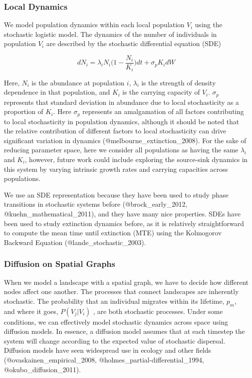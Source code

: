 \hypertarget{local-dynamics}{%
\subsubsection{Local Dynamics}\label{local-dynamics}}

We model population dynamics within each local population \(V_i\) using
the stochastic logistic model. The dynamics of the number of individuals
in population \(V_i\) are described by the stochastic differential
equation (SDE)

\[dN_i=\lambda_i N_i \big(1 - \frac{N_i}{K_i}\big)dt+\sigma_pK_idW\]

Here, \(N_i\) is the abundance at population \(i\), \(\lambda_i\) is the
strength of density dependence in that population, and \(K_i\) is the
carrying capacity of \(V_i\). \(\sigma_p\) represents that standard
deviation in abundance due to local stochasticity as a proportion of
\(K_i\). Here \(\sigma_p\) represents an amalgamation of all factors
contributing to local stochasticity in population dynamics, although it
should be noted that the relative contribution of different factors to
local stochasticity can drive significant variation in dynamics
(@melbourne\_extinction\_2008). For the sake of reducing parameter
space, here we consider all populations as having the same \(\lambda_i\)
and \(K_i\), however, future work could include exploring the
source-sink dynamics in this system by varying intrinsic growth rates
and carrying capacities across populations.

We use an SDE representation because they have been used to study phase
transitions in stochastic systems before (@brock\_early\_2012,
@kuehn\_mathematical\_2011), and they have many nice properties. SDEs
have been used to study extinction dynamics before, as it is relatively
straightforward to compute the mean time until extinction (MTE) using
the Kolmogorov Backward Equation (@lande\_stochastic\_2003).

\hypertarget{diffusion-on-spatial-graphs}{%
\subsubsection{Diffusion on Spatial
Graphs}\label{diffusion-on-spatial-graphs}}

When we model a landscape with a spatial graph, we have to decide how
different nodes affect one another. The processes that connect
landscapes are inherently stochastic. The probability that an individual
migrates within its lifetime, \(p_m\), and where it goes, \(P(V_j|V_i)\)
, are both stochastic processes. Under some conditions, we can
effectively model stochastic dynamics across space using diffusion
models. In essence, a diffusion model assumes that at each timestep the
system will change according to the expected value of stochastic
dispersal. Diffusion models have seen widespread use in ecology and
other fields (@ovaskainen\_empirical\_2008,
@holmes\_partial-differential\_1994, @okubo\_diffusion\_2011).

